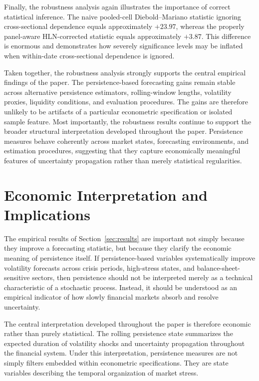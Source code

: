 \documentclass[unnumsec,webpdf,contemporary,large]{oup-authoring-template}%
\theoremstyle{thmstyleone}%
\theoremstyle{thmstyletwo}%
\theoremstyle{thmstylethree}%
\begin{document}
Finally, the robustness analysis again illustrates the importance of
correct statistical inference. The naive pooled-cell Diebold--Mariano
statistic ignoring cross-sectional dependence equals approximately
$+23.97$, whereas the properly panel-aware HLN-corrected statistic equals
approximately $+3.87$. This difference is enormous and demonstrates how
severely significance levels may be inflated when within-date
cross-sectional dependence is ignored.

Taken together, the robustness analysis strongly supports the central
empirical findings of the paper. The persistence-based forecasting gains
remain stable across alternative persistence estimators, rolling-window
lengths, volatility proxies, liquidity conditions, and evaluation
procedures. The gains are therefore unlikely to be artifacts of a
particular econometric specification or isolated sample feature. Most
importantly, the robustness results continue to support the broader
structural interpretation developed throughout the paper. Persistence
measures behave coherently across market states, forecasting environments,
and estimation procedures, suggesting that they capture economically
meaningful features of uncertainty propagation rather than merely
statistical regularities.



\section{Economic Interpretation and Implications}
\label{sec:economic}

The empirical results of Section~\ref{sec:results} are important not
simply because they improve a forecasting statistic, but because they
clarify the economic meaning of persistence itself. If persistence-based
variables systematically improve volatility forecasts across crisis periods,
high-stress states, and balance-sheet-sensitive sectors, then persistence
should not be interpreted merely as a technical characteristic of a
stochastic process. Instead, it should be understood as an empirical
indicator of how slowly financial markets absorb and resolve uncertainty.

The central interpretation developed throughout the paper is therefore
economic rather than purely statistical. The rolling persistence state
summarizes the expected duration of volatility shocks and uncertainty
propagation throughout the financial system. Under this interpretation,
persistence measures are not simply filters embedded within econometric
specifications. They are state variables describing the temporal
organization of market stress.
\end{document}
